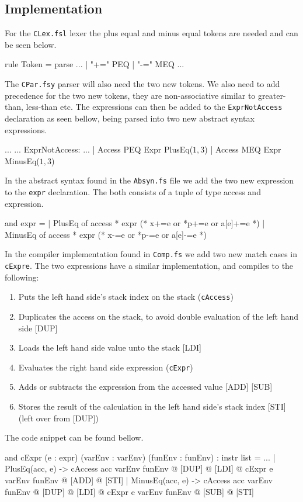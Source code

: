 \subsection{Implementation}
For the \texttt{CLex.fsl} lexer the plus equal and minus equal tokens are needed
and can be seen below.
\begin{fs}
rule Token = parse
...
  | "+="            { PEQ }
  | "-="            { MEQ }
...
\end{fs}
The \texttt{CPar.fsy} parser will also need the two new tokens. We also need to add precedence for
the two new tokens, they are non-associative similar to greater-than, less-than
etc. The expressions can then be added to the \texttt{ExprNotAccess} declaration as seen
bellow, being parsed into two new abstract syntax expressions.
\begin{fs}
...
...
ExprNotAccess:
...
  | Access PEQ Expr                     { PlusEq($1, $3)      } 
  | Access MEQ Expr                     { MinusEq($1, $3)     } 

\end{fs}
In the abstract syntax found in the \texttt{Absyn.fs} file we add the two new
expression to the \texttt{expr} declaration. The both consists of a tuple of type access and expression.
\begin{fs}
and expr =                                                         
  | PlusEq of access * expr          (* x+=e or *p+=e or a[e]+=e    *)
  | MinusEq of access * expr         (* x-=e or *p-=e or a[e]-=e    *)
\end{fs}
In the compiler implementation found in \texttt{Comp.fs} we add two new match
cases in \texttt{cExpre}. The two expressions have a similar implementation, and
compiles to the following:
\begin{enumerate}
    \item Puts the left hand side's stack index on the stack (\texttt{cAccess})
    \item Duplicates the access on the stack, to avoid double evaluation of the
        left hand side [DUP]
    \item Loads the left hand side value unto the stack [LDI]
    \item Evaluates the right hand side expression (\texttt{cExpr})
    \item Adds or subtracts the expression from the accessed value [ADD] [SUB] 
    \item Stores the result of the calculation in the left hand side's stack
        index [STI] (left over from [DUP])
\end{enumerate}
The code snippet can be found bellow.
\begin{fs}
and cExpr (e : expr) (varEnv : varEnv) (funEnv : funEnv) : instr list = 
...
    | PlusEq(acc, e)  -> cAccess acc varEnv funEnv @ [DUP] @ [LDI] @ cExpr e varEnv funEnv @ [ADD] @ [STI]
    | MinusEq(acc, e)  -> cAccess acc varEnv funEnv @ [DUP] @ [LDI] @ cExpr e varEnv funEnv @ [SUB] @ [STI]
\end{fs}

